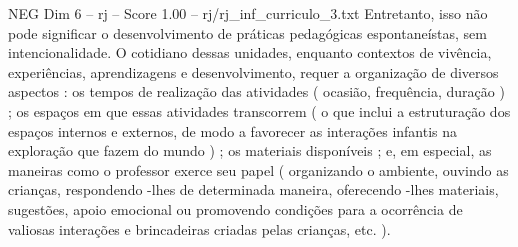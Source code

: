 \begin{textsample}{NEG Dim 6 – rj – Score 1.00 – rj/rj\_inf\_curriculo\_3.txt}
Entretanto, isso não pode significar o desenvolvimento de práticas pedagógicas espontaneístas, sem intencionalidade.
O cotidiano dessas unidades, enquanto contextos de vivência, experiências, aprendizagens e desenvolvimento, requer a organização de diversos aspectos : os tempos de realização das atividades ( ocasião, frequência, duração ) ; os espaços em que essas atividades transcorrem ( o que inclui a estruturação dos espaços internos e externos, de modo a favorecer as interações infantis na exploração que fazem do mundo ) ; os materiais disponíveis ; e, em especial, as maneiras como o professor exerce seu papel ( organizando o ambiente, ouvindo as crianças, respondendo -lhes de determinada maneira, oferecendo -lhes materiais, sugestões, apoio emocional ou promovendo condições para a ocorrência de valiosas interações e brincadeiras criadas pelas crianças, etc. ).

\end{textsample}
